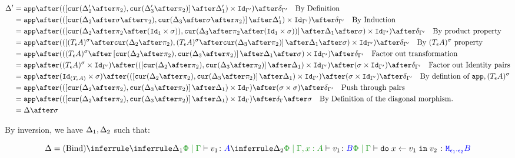 \documentclass{report}
\begin{document}
\begin{align*}
    \D' & =\app\after((\fld{\cur{\D_2'\after\pp}}{\cur{\D_3'\after\pp}}\after\D_1')\times \Id{\G'})\after\diag{\G'}\qt{By Definition}\\
    & =\app\after((\fld{\cur{\D_2\after\si\after\pp}}{\cur{\D_3\after\si\after\pp}}\after\D_1')\times \Id{\G'})\after\diag{\G'}\qt{By Induction}\\
    & = \app\after((\fld{\cur{\D_2\after\pp\after(\Id{\1}\times \si)}}{\cur{\D_3\after\pp\after(\Id{\1}\times \si)}}\after\D_1\after\si)\times \Id{\G'})\after\diag{\G'}\qt{By product property}\\
    & = \app\after((\fld{(\tea)^{\si}\after\cur{\D_2\after\pp}}{(\tea)^{\si}\after\cur{\D_3\after\pp}}\after\D_1\after\si)\times \Id{\G'})\after\diag{\G'}\qt{By $(\tea)^{\si}$ property}\\
    & = \app\after(((\tea)^{\si}\after\fld{\cur{\D_2\after\pp}}{\cur{\D_3\after\pp}}\after\D_1\after\si)\times \Id{\G'})\after\diag{\G'}\qt{Factor out transformation}\\
    & = \app\after((\tea)^{\si}\times\Id{\G'})\after((\fld{\cur{\D_2\after\pp}}{\cur{\D_3\after\pp}}\after\D_1)\times \Id{\G'})\after(\si \times \Id{\G'})\after\diag{\G'}\qt{Factor out Identity pairs}\\
    & = \app\after(\Id{(\tea)}\times\si)\after((\fld{\cur{\D_2\after\pp}}{\cur{\D_3\after\pp}}\after\D_1) \times \Id{\G'})\after(\si \times \Id{\G'})\after\diag{\G'}\qt{By defintion of $\app, (\tea)^{\si}$}\\
    & = \app\after((\fld{\cur{\D_2\after\pp}}{\cur{\D_3\after\pp}}\after\D_1)\times \idg)\after(\si \times \si)\after\diag{\G'}\qt{Push through pairs}\\
    & = \app\after((\fld{\cur{\D_2\after\pp}}{\cur{\D_3\after\pp}}\after\D_1)\times \idg)\after\diag{\G}\after\si\qt{By Definition of the diagonal morphism.}\\
    & = \D\after\si
\end{align*}



By inversion, we have $\Delta_1, \Delta_2$ such that:

\begin{equation}
    \D = \ntreeruleII{Bind}{
        \treeruleI{\D_1}{\etyperelation{\P}{\G}{v_1}{A}}
        }{
        \treeruleI{\D_2}{\etyperelation{\P}{\G, x:A }{v_1}{B}}
    }{
        \etyperelation{\P}{\G}{\doin{x}{v_1}{v_2}}{\M{\e_1\dot\e_2}{B}}
    }
\end{equation}
\end{document}
